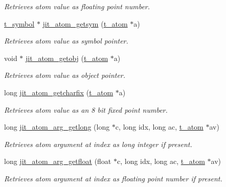 \begin{DoxyCompactItemize}
\begin{DoxyCompactList}\small\item\em Retrieves atom value as floating point number. \item\end{DoxyCompactList}\item 
\hyperlink{structt__symbol}{t\_\-symbol} $\ast$ \hyperlink{group__atommod_ga73b81472812e4c5475d07d9914d84f89}{jit\_\-atom\_\-getsym} (\hyperlink{structt__atom}{t\_\-atom} $\ast$a)
\begin{DoxyCompactList}\small\item\em Retrieves atom value as symbol pointer. \item\end{DoxyCompactList}\item 
void $\ast$ \hyperlink{group__atommod_ga84dda6fa7e1e2f29e897c1d87a06ba8e}{jit\_\-atom\_\-getobj} (\hyperlink{structt__atom}{t\_\-atom} $\ast$a)
\begin{DoxyCompactList}\small\item\em Retrieves atom value as object pointer. \item\end{DoxyCompactList}\item 
long \hyperlink{group__atommod_ga52eb4a47524e12d8999cd8606a0d2e31}{jit\_\-atom\_\-getcharfix} (\hyperlink{structt__atom}{t\_\-atom} $\ast$a)
\begin{DoxyCompactList}\small\item\em Retrieves atom value as an 8 bit fixed point number. \item\end{DoxyCompactList}\item 
long \hyperlink{group__atommod_ga4ef6f5e500d63209a1fd5e14c49b2fa3}{jit\_\-atom\_\-arg\_\-getlong} (long $\ast$c, long idx, long ac, \hyperlink{structt__atom}{t\_\-atom} $\ast$av)
\begin{DoxyCompactList}\small\item\em Retrieves atom argument at index as long integer if present. \item\end{DoxyCompactList}\item 
long \hyperlink{group__atommod_gaa75d6ca44c5972162eb78ce62b7c39d1}{jit\_\-atom\_\-arg\_\-getfloat} (float $\ast$c, long idx, long ac, \hyperlink{structt__atom}{t\_\-atom} $\ast$av)
\begin{DoxyCompactList}\small\item\em Retrieves atom argument at index as floating point number if present. \item\end{DoxyCompactList}\item 

\end{DoxyCompactItemize}
